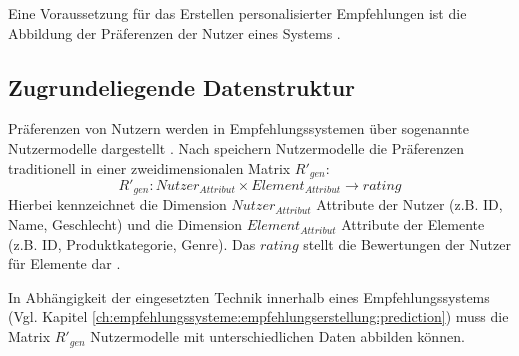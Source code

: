 Eine Voraussetzung für das Erstellen personalisierter Empfehlungen ist die Abbildung der Präferenzen der Nutzer eines Systems \cite[S. 36]{berkovsky:2:article}.

\subsection{Zugrundeliegende Datenstruktur}%
\label{ch:empfehlungssysteme:preferences:data}
Präferenzen von Nutzern werden in Empfehlungssystemen über sogenannte Nutzermodelle dargestellt \cite[S. 9]{ricci:inbook}\cite[S. 2]{jawaheer:article}\cite[S. 246]{berkovsky:article}.
Nach \textcite[S. 249f.]{berkovsky:article} speichern Nutzermodelle die Präferenzen traditionell in einer zweidimensionalen Matrix $R'_{gen}$:
\begin{equation}\label{eq4}
    R'_{gen}: Nutzer_{Attribut} \times Element_{Attribut} \rightarrow rating
\end{equation}
Hierbei kennzeichnet die Dimension $Nutzer_{Attribut}$ Attribute der Nutzer (z.B. ID, Name, Geschlecht) und die Dimension $Element_{Attribut}$ Attribute der Elemente (z.B. ID, Produktkategorie, Genre).
Das $rating$ stellt die Bewertungen der Nutzer für Elemente dar \cite[S. 250]{berkovsky:article}.

In Abhängigkeit der eingesetzten Technik innerhalb eines Empfehlungssystems (Vgl. Kapitel \ref{ch:empfehlungssysteme:empfehlungserstellung:prediction}) muss die Matrix $R'_{gen}$ Nutzermodelle mit unterschiedlichen Daten abbilden können. %

